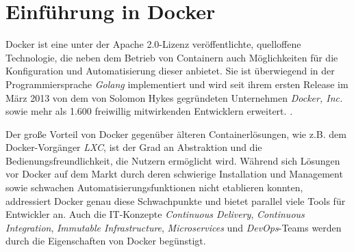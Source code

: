 \documentclass[../main.tex]{subfiles}
\begin{document}


  \section{Einführung in Docker}
  \label{dockerIntro}
    Docker ist eine unter der Apache 2.0-Lizenz veröffentlichte, quelloffene Technologie, die neben dem Betrieb von Containern auch Möglichkeiten für die Konfiguration und Automatisierung dieser anbietet. Sie ist überwiegend in der Programmiersprache \emph{Golang} implementiert und wird seit ihrem ersten Release im März 2013 von dem von Solomon Hykes gegründeten Unternehmen \emph{Docker, Inc.}\cite{dockerHykes} sowie mehr als 1.600 freiwillig mitwirkenden Entwicklern erweitert. \cite{githubDocker}\cite[S.7]{dockerBook}\cite{githubDockerChangelog}\cite{dockerCompany}.




    Der große Vorteil von Docker gegenüber älteren Containerlösungen, wie z.B. dem Docker-Vorgänger \emph{LXC}, ist der Grad an Abstraktion und die Bedienungsfreundlichkeit, die Nutzern ermöglicht wird. Während sich Lösungen vor Docker auf dem Markt durch deren schwierige Installation und Management sowie schwachen Automatisierungsfunktionen nicht etablieren konnten, addressiert Docker genau diese Schwachpunkte \cite[S.7]{dockerBook} und bietet parallel viele Tools für Entwickler an. Auch die IT-Konzepte \emph{Continuous Delivery}, \emph{Continuous Integration}, \emph{Immutable Infrastructure}, \emph{Microservices} und \emph{DevOps}-Teams werden durch die Eigenschaften von Docker begünstigt.
\end{document}
